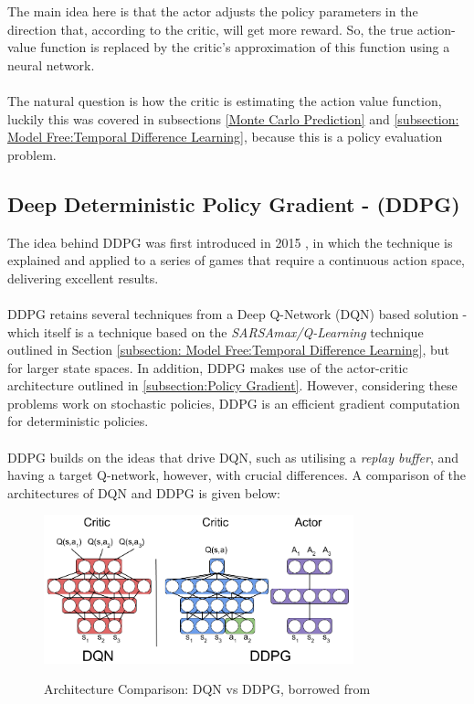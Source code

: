 \documentclass[ %
                    author={Ashwinder Khurana},
                supervisor={Prof Dave Cliff},
                    degree={MEng},
                     title={The Deeply Reinforced Trader},
                  subtitle={},
                      type={enterprise},
                      year={2020} ]{dissertation}
\begin{document}
{\noindent
The main idea here is that the actor adjusts the policy parameters in the direction that, according to the critic, will get more reward. So, the true action-value function is replaced by the critic's approximation of this function using a neural network. 
\\
\\
\noindent
The natural question is how the critic is estimating the action value function, luckily this was covered in subsections \ref{Monte Carlo Prediction} and \ref{subsection: Model Free:Temporal Difference Learning}, because this is a policy evaluation problem. 

\subsection{Deep Deterministic Policy Gradient - (DDPG)}
\label{subsection:Deep Deterministic Policy Gradient}
The idea behind DDPG was first introduced in 2015 \cite{DDPG}, in which the technique is explained and applied to a series of games that require a continuous action space, delivering excellent results. 
\\
\\
DDPG retains several techniques from a Deep Q-Network (DQN) based solution - which itself is a technique based on the \textit{SARSAmax/Q-Learning} technique outlined in Section \ref{subsection: Model Free:Temporal Difference Learning}, but for larger state spaces. In addition, DDPG makes use of the actor-critic architecture outlined in \ref{subsection:Policy Gradient}. However, considering these problems work on stochastic policies, DDPG is an efficient gradient computation for deterministic policies. 
\\
\\
\noindent
DDPG builds on the ideas that drive DQN, such as utilising a \textit{replay buffer}, and having a target Q-network, however, with crucial differences. A comparison of the architectures of DQN and DDPG is given below:

\begin{figure}[H]
  
	\centering
  	\includegraphics[width=0.8\textwidth]{DQN-DDPG-Arch.png}
  	\caption{Architecture Comparison: DQN vs DDPG, borrowed from} \cite{DDPG-vs-DQN}
	 \label{fig:DQN-DDPG-Arch}


\end{figure}}
\end{document}
